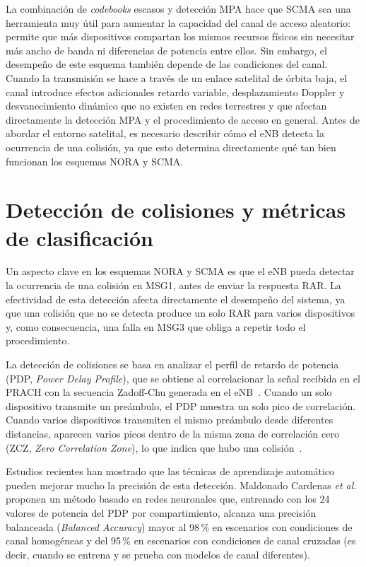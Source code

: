 La combinación de \textit{codebooks} escasos y detección MPA hace que SCMA sea una herramienta muy
útil para aumentar la capacidad del canal de acceso aleatorio: permite que más dispositivos
compartan los mismos recursos físicos sin necesitar más ancho de banda ni diferencias de
potencia entre ellos. Sin embargo, el desempeño de este esquema también depende de las
condiciones del canal. Cuando la transmisión se hace a través de un enlace satelital de
órbita baja, el canal introduce efectos adicionales retardo variable, desplazamiento
Doppler y desvanecimiento dinámico que no existen en redes terrestres y que afectan
directamente la detección MPA y el procedimiento de acceso en general. Antes de abordar el
entorno satelital, es necesario describir cómo el eNB detecta la ocurrencia de una
colisión, ya que esto determina directamente qué tan bien funcionan los esquemas NORA y SCMA.


\section{Detección de colisiones y métricas de clasificación}
\label{sec:deteccion_colisiones}

Un aspecto clave en los esquemas NORA y SCMA es que el eNB pueda
detectar la ocurrencia de una colisión en MSG1, antes de enviar la respuesta RAR. La
efectividad de esta detección afecta directamente el desempeño del sistema, ya que una
colisión que no se detecta produce un solo RAR para varios dispositivos y, como
consecuencia, una falla en MSG3 que obliga a repetir todo el procedimiento.

La detección de colisiones se basa en analizar el perfil de retardo de potencia (PDP,
\textit{Power Delay Profile}), que se obtiene al correlacionar la señal recibida en el PRACH
con la secuencia Zadoff-Chu generada en el eNB~\cite{ref11}. Cuando un solo
dispositivo transmite un preámbulo, el PDP muestra un solo pico de correlación. Cuando varios
dispositivos transmiten el mismo preámbulo desde diferentes distancias, aparecen varios picos
dentro de la misma zona de correlación cero (ZCZ, \textit{Zero Correlation Zone}), lo que
indica que hubo una colisión~\cite{ref11}.

Estudios recientes han mostrado que las técnicas de aprendizaje automático pueden mejorar
mucho la precisión de esta detección. Maldonado Cardenas \textit{et al.}~\cite{ref11}
proponen un método basado en redes neuronales que, entrenado con los 24 valores de potencia
del PDP por compartimiento, alcanza una precisión balanceada (\textit{Balanced Accuracy})
mayor al 98\,\% en escenarios con condiciones de canal homogéneas y del 95\,\% en
escenarios con condiciones de canal cruzadas (es decir, cuando se entrena y se prueba con
modelos de canal diferentes).


